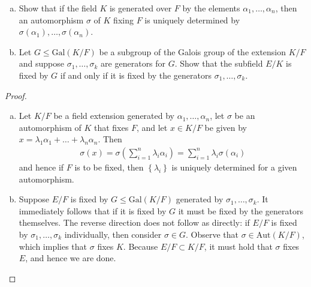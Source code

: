\documentclass[num=10,duedate=04-14-21,course=Algebra\ II,proflastname=Walton]{hwtemplate}
\begin{document}
\problem[4]
\begin{claim}
	\begin{enumerate}[(a).]
	\item Show that if the field \(K\) is generated over \(F\) by the elements \(\alpha _1,\ldots,\alpha_n\), then an automorphism \(\sigma \) of \(K\) fixing \(F\) is uniquely determined by \(\sigma (\alpha _1),\ldots,\sigma (\alpha _n)\).
	\item Let \(G\leq \textrm{Gal}(K / F)\) be a subgroup of the Galois group of the extension \(K / F\) and suppose \(\sigma_1,\ldots,\sigma_k\) are generators for \(G\). Show that the subfield \(E / K\) is fixed by \(G\) if and only if it is fixed by the generators \(\sigma_1,\ldots,\sigma_k\).
	\end{enumerate}
\end{claim}
\begin{proof}
	\begin{enumerate}[(a).]
		\item Let \(K / F\) be a field extension generated by \(\alpha_1,\ldots,\alpha_n\), let \(\sigma \) be an automorphism of \(K\) that fixes \(F\), and let \(x \in K / F\) be given by \(x = \lambda_1 \alpha_1 + \ldots + \lambda_n \alpha_n\). Then
			\begin{align*}
				\sigma(x) = \sigma (\sum_{i=1}^{n} \lambda_i\alpha_i) = \sum_{i=1}^{n} \lambda_i \sigma (\alpha_i)
			\end{align*}
			and hence if \(F\) is to be fixed, then \(\left\{ \lambda_i \right\} \) is uniquely determined for a given automorphism.
		\item Suppose \(E / F\) is fixed by \(G\leq \textrm{Gal}(K / F)\) generated by \(\sigma_1,\ldots,\sigma_k\). It immediately follows that if it is fixed by \(G\) it must be fixed by the generators themselves. The reverse direction does not follow as directly: if \(E / F\) is fixed by \(\sigma_1,\ldots,\sigma_k\) individually, then consider \(\sigma  \in G\). Observe that \(\sigma \in \textrm{Aut}(K / F)\), which implies that \(\sigma \) fixes \(K\). Because \(E / F \subset K / F\), it must hold that \(\sigma \) fixes \(E\), and hence we are done.
	\end{enumerate}
\end{proof}
\end{document}
